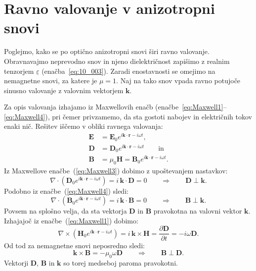 \section{Ravno valovanje v anizotropni snovi}
Poglejmo, kako se po optično anizotropni snovi širi ravno valovanje. 
Obravnavajmo neprevodno snov in njeno dielektričnost 
zapišimo z realnim tenzorjem $\underline{\varepsilon}$ (enačba~\ref{eq:10_003}). 
Zaradi enostavnosti se omejimo na nemagnetne snovi, za katere je $\mu = 1$. 
Naj na tako snov vpada ravno potujoče sinusno valovanje z 
valovnim vektorjem $\mathbf{k}$.  

Za opis valovanja izhajamo iz Maxwellovih enačb (enačbe~\ref{eq:Maxwell1}--\ref{eq:Maxwell4}), 
pri čemer privzamemo, da sta gostoti nabojev in električnih tokov enaki nič. 
Rešitev iščemo v obliki ravnega valovanja:
\begin{align}
 \mathbf{E} &= \mathbf{E}_0 e^{i\mathbf{k}\cdot \mathbf{r} - i \omega t}, \label{eq:10_010}\\
 \mathbf{D} &= \mathbf{D}_0 e^{i\mathbf{k}\cdot \mathbf{r} - i \omega t} \qquad \mathrm{in}\label{eq:10_011}\\
 \mathbf{B} &= \mu_0 \mathbf{H} = \mathbf{B}_0 e^{i\mathbf{k}\cdot \mathbf{r} - i \omega t}.
 \label{eq:10_012}
\end{align}
Iz Maxwellove enačbe~(\ref{eq:Maxwell3}) dobimo z upoštevanjem nastavkov:
\begin{equation}
\nabla \cdot \left(\mathbf{D}_0 e^{i\mathbf{k}\cdot \mathbf{r} - i \omega t} \right) = 
i\,\mathbf{k}\cdot \mathbf{D} = 0 \qquad \Longrightarrow \qquad \mathbf{D} \perp \mathbf{k}.
\label{eq:10_013}
\end{equation}
Podobno iz enačbe~(\ref{eq:Maxwell4}) sledi:
\begin{equation}
\nabla \cdot \left(\mathbf{B}_0 e^{i\mathbf{k}\cdot \mathbf{r} - i \omega t} \right) = 
i\,\mathbf{k}\cdot \mathbf{B} = 0 \qquad \Longrightarrow \qquad \mathbf{B} \perp \mathbf{k}.
\label{eq:10_014}
\end{equation}
Povsem na splošno velja, da sta vektorja $\mathbf{D}$ in $\mathbf{B}$ pravokotna na valovni vektor $\mathbf{k}$.
Izhajajoč iz enačbe~(\ref{eq:Maxwell1}) dobimo:
\begin{equation}
\nabla \times \left(\mathbf{H}_0 e^{i\mathbf{k}\cdot \mathbf{r} - i \omega t} \right) = 
i\,\mathbf{k}\times \mathbf{H} = \frac{\partial \mathbf{D}}{\partial t} = -i \omega \mathbf{D}.
\label{eq:10_015}
\end{equation}
Od tod za nemagnetne snovi neposredno sledi:
\begin{equation}
\mathbf{k}\times \mathbf{B} = - \mu_0 \omega \mathbf{D} \qquad \Longrightarrow \qquad \mathbf{B} \perp \mathbf{D}.
\label{eq:10_016}
\end{equation}
Vektorji $\mathbf{D}$, $\mathbf{B}$ in $\mathbf{k}$ so torej medseboj paroma pravokotni.

